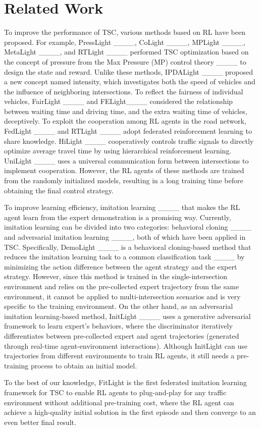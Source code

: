 \section{Related Work}
\vspace{-1ex}
To improve the performance of TSC, various methods based on RL have been proposed. For example, PressLight ____, CoLight ____, MPLight ____, MetaLight ____, and RTLight ____ performed TSC optimization based on the concept of pressure from the Max Pressure (MP) control theory ____ to design the state and reward. Unlike these methods, IPDALight ____ proposed a new concept named intensity, which investigates both the speed of vehicles and the influence of neighboring intersections. To reflect the fairness of individual vehicles, FairLight ____ and FELight____ considered the relationship between waiting time and driving time, and the extra waiting time of vehicles, deceptively. To exploit the cooperation among RL agents in the road network, FedLight ____ and RTLight ____ adopt federated reinforcement learning to share knowledge. HiLight ____ cooperatively controls traffic signals to directly optimize average travel time by using hierarchical reinforcement learning. UniLight ____ uses a universal communication form between intersections to implement cooperation. However, the RL agents of these methods are trained from the randomly initialized models, resulting in a long training time before obtaining the final control strategy.

To improve learning efficiency, imitation learning ____ that makes the RL agent learn from the expert demonstration is a promising way. Currently, imitation learning can be divided into two categories: behavioral cloning ____ and adversarial imitation learning ____, both of which have been applied in TSC. Specifically, DemoLight ____ is a behavioral cloning-based method that reduces the imitation learning task to a common classification task ____ by minimizing the action difference between the agent strategy and the expert strategy. However, since this method is trained in the single-intersection environment and relies on the pre-collected expert trajectory from the same environment, it cannot be applied to multi-intersection scenarios and is very specific to the training environment. On the other hand, as an adversarial imitation learning-based method, InitLight ____ uses a generative adversarial framework to learn expert's behaviors, where the discriminator iteratively differentiates between pre-collected expert and agent trajectories (generated through real-time agent-environment interactions). Although InitLight can use trajectories from different environments to train RL agents, it still needs a pre-training process to obtain an initial model.

To the best of our knowledge, FitLight is the first federated imitation learning framework for TSC to enable RL agents to plug-and-play for any traffic environment without additional pre-training cost, where the RL agent can achieve a high-quality initial solution in the first episode and then converge to an even better final result.

\vspace{-1ex}